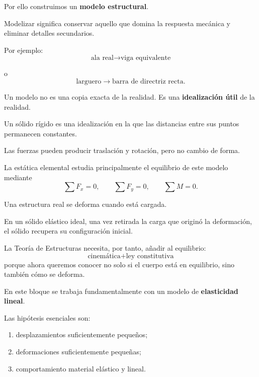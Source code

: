 
Por ello construimos un \textbf{modelo estructural}.

Modelizar significa conservar aquello que domina la respuesta mecánica y eliminar detalles secundarios.

Por ejemplo:
\[
\text{ala real}\longrightarrow\text{viga equivalente}
\]

o
\[
\text{larguero}\longrightarrow\text{barra de directriz recta}.
\]

\begin{ojo}
Un modelo no es una copia exacta de la realidad. Es una \textbf{idealización útil} de la realidad.
\end{ojo}


Un sólido rígido es una idealización en la que las distancias entre sus puntos permanecen constantes.

Las fuerzas pueden producir traslación y rotación, pero no cambio de forma.

La estática elemental estudia principalmente el equilibrio de este modelo mediante
\[
\sum F_x=0,\qquad \sum F_y=0,\qquad \sum M=0.
\]

Una estructura real se deforma cuando está cargada.

En un sólido elástico ideal, una vez retirada la carga que originó la deformación, el sólido recupera su configuración inicial.

La Teoría de Estructuras necesita, por tanto, añadir al equilibrio:
\[
\text{cinemática}+\text{ley constitutiva}
\]
porque ahora queremos conocer no solo si el cuerpo está en equilibrio, sino también cómo se deforma.

En este bloque se trabaja fundamentalmente con un modelo de \textbf{elasticidad lineal}.

Las hipótesis esenciales son:
\begin{enumerate}
  \item desplazamientos suficientemente pequeños;
  \item deformaciones suficientemente pequeñas;
  \item comportamiento material elástico y lineal.
\end{enumerate}

